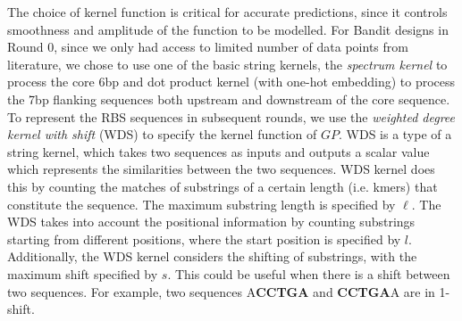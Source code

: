 The choice of kernel function is critical for accurate predictions, since it controls smoothness and amplitude of the function to be modelled.
For Bandit designs in Round 0, since we only had access to limited number of data points from literature, we chose to use one of the basic string kernels, the \textit{spectrum kernel} \cite{leslie2001spectrum} to process the core 6bp and dot product kernel \cite{Rasmussen2004} (with one-hot embedding) to process the 7bp flanking sequences both upstream and downstream of the core sequence.
To represent the RBS sequences in subsequent rounds, we use the \textit{weighted degree kernel with shift} (WDS) \cite{ratsch_rase_2005_wds,Ben-Hur2008} to specify the kernel function of $GP$.
WDS is a type of a string kernel, which takes two sequences as inputs and outputs a scalar value which represents the similarities between the two sequences.
WDS kernel does this by counting the matches of substrings of a certain length (i.e. kmers) that constitute the sequence.
The maximum substring length is specified by $\ell$.
The WDS takes into account the positional information by counting substrings starting from different positions, where the start position is specified by $l$.
Additionally, the WDS kernel considers the shifting of substrings, with the maximum shift specified by $s$.
This could be useful when there is a shift between two sequences.
For example, two sequences A\textbf{CCTGA} and \textbf{CCTGA}A are in 1-shift. \\

